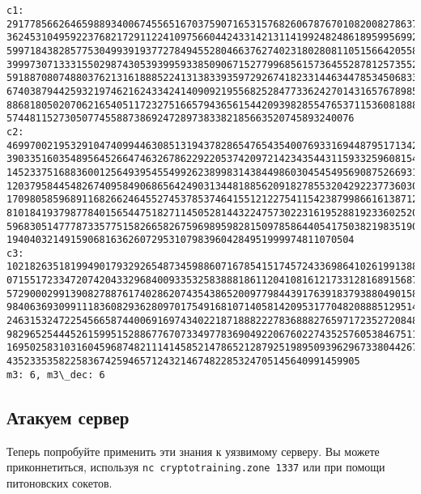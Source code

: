 \documentclass[11pt]{article}
\begin{document}
    \begin{Verbatim}[commandchars=\\\{\}]
c1: 2917785662646598893400674556516703759071653157682606787670108200827863775965
36245310495922376821729112241097566044243314213114199248248618959956992032462919
59971843828577530499391937727849455280466376274023180280811051566420558576090046
39997307133315502987430539399593385090671527799685615736455287812573552757610882
59188708074880376213161888522413138339359729267418233144634478534506833079123369
67403879442593219746216243342414090921955682528477336242701431657678985714164377
88681805020706216540511723275166579436561544209398285547653711536081888046644666
574481152730507745588738692472897383382185663520745893240076
c2: 4699700219532910474099446308513194378286547654354007693316944879517134203166
39033516035489564526647463267862292205374209721423435443115933259608154793907285
14523375168836001256493954554992623899831438449860304545495690875266931303861537
12037958445482674095849068656424903134481885620918278553204292237736030202619489
17098058596891168266246455274537853746415512122754115423879986616138712111657580
81018419379877840156544751827114505281443224757302231619528819233602520309733745
59683051477787335775158266582675969895982815097858644054175038219835190013872610
194040321491590681636260729531079839604284951999974811070504
c3: 1021826351819949017932926548734598860716785415174572433698641026199138812318
07155172334720742043329684009335325838881861120410816121733128168915687720675958
57290002991390827887617402862074354386520097798443917639183793880490158857045378
98406369309911183608293628097017549168107140581420953177048208885129514903707695
24631532472254566587440069169743402218718882227836888276597172352720848804246680
98296525444526159951528867767073349778369049220676022743525760538467511790246995
16950258310316045968748211141458521478652128792519895093962967338044267529997018
4352335358225836742594657124321467482285324705145640991459905
m3: 6, m3\_dec: 6
    \end{Verbatim}

    \subsection{Атакуем
сервер}\label{ux430ux442ux430ux43aux443ux435ux43c-ux441ux435ux440ux432ux435ux440}

Теперь попробуйте применить эти знания к уязвимому серверу. Вы можете
приконнетиться, используя \texttt{nc\ cryptotraining.zone\ 1337} или при
помощи питоновских сокетов.
\end{document}
